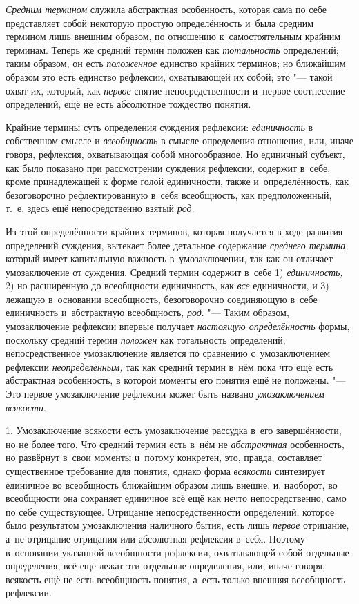 {\em Средним термином}
служила абстрактная особенность, которая сама по себе
представляет собой некоторую простую определённость и~была средним термином
лишь внешним образом, по отношению к~самостоятельным крайним терминам.
Теперь же средний термин положен как
{\em тотальность}
определений; таким образом, он есть
{\em положенное} единство
крайних терминов; но ближайшим образом это есть единство рефлексии,
охватывающей их собой; это "--- такой охват их, который, как
{\em первое} снятие
непосредственности и~первое соотнесение определений, ещё не есть абсолютное
тождество понятия.

Крайние термины суть определения суждения рефлексии:
{\em единичность} в
собственном смысле и {\em всеобщность}
в смысле определения отношения, или, иначе говоря, рефлексия,
охватывающая собой многообразное. Но единичный субъект, как было показано
при рассмотрении суждения рефлексии, содержит в~себе, кроме принадлежащей к
форме голой единичности, также и~определённость, как безоговорочно
рефлектированную в~себя всеобщность, как предположенный, т.~е. здесь ещё
непосредственно взятый {\em род}.

Из этой определённости крайних терминов, которая получается в
ходе развития определений суждения, вытекает более детальное содержание
{\em среднего термина,}
который имеет капитальную важность в~умозаключении, так как
он отличает умозаключение от суждения. Средний термин содержит в~себе 1)
{\em единичность,} 2) но
расширенную до всеобщности единичность, как
{\em все} единичности, и
3) лежащую в~основании всеобщность, безоговорочно соединяющую в~себе
единичность и~абстрактную всеобщность,
{\em род}. "--- Таким
образом, умозаключение рефлексии впервые получает
{\em настоящую определённость}
формы, поскольку средний термин
{\em положен} как
тотальность определений; непосредственное умозаключение является
по сравнению с~умозаключением рефлексии
{\em неопределённым,} так
как средний термин в~нём пока что ещё есть абстрактная особенность, в
которой моменты его понятия ещё не положены. "--- Это первое
умозаключение рефлексии может быть названо
{\em умозаключением
всякости}.


1. Умозаключение всякости есть умозаключение рассудка в~его
завершённости, но не более того. Что средний термин есть в~нём не
{\em абстрактная}
особенность, но развёрнут в~свои моменты и~потому конкретен,
это, правда, составляет существенное требование для понятия, однако форма
{\em всякости}
синтезирует единичное во всеобщность ближайшим образом лишь
внешне, и, наоборот, во всеобщности она сохраняет единичное всё ещё как
нечто непосредственно, само по себе существующее. Отрицание
непосредственности определений, которое было результатом умозаключения
наличного бытия, есть лишь {\em первое}
отрицание, а~не отрицание отрицания или абсолютная рефлексия
в~себя. Поэтому в~основании указанной всеобщности рефлексии, охватывающей
собой отдельные определения, всё ещё лежат эти отдельные определения, или,
иначе говоря, всякость ещё не есть всеобщность понятия, а~есть только
внешняя всеобщность рефлексии.

